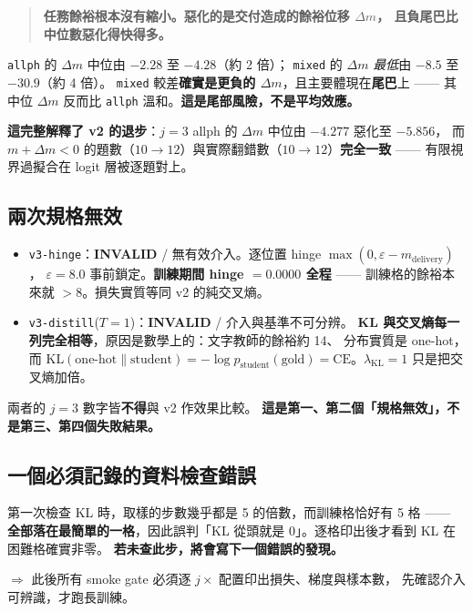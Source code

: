 \documentclass[11pt, a4paper]{article}
\newcommand{\INVALID}{\textcolor{orange!80!black}{\textbf{INVALID}}}
\begin{document}
\begin{quote}
\textbf{任務餘裕根本沒有縮小。惡化的是交付造成的餘裕位移 $\Delta m$，
且負尾巴比中位數惡化得快得多。}
\end{quote}

\verb|allph| 的 $\Delta m$ 中位由 $-2.28$ 至 $-4.28$（約 2 倍）；
\verb|mixed| 的 $\Delta m$ \emph{最低}由 $-8.5$ 至 $-30.9$（約 4 倍）。
\verb|mixed| 較差\textbf{確實是更負的 $\Delta m$}，且主要體現在\textbf{尾巴}上 ——
其中位 $\Delta m$ 反而比 \verb|allph| 溫和。\textbf{這是尾部風險，不是平均效應。}

\textbf{這完整解釋了 v2 的退步}：$j{=}3$ allph 的 $\Delta m$ 中位由 $-4.277$ 惡化至 $-5.856$，
而 $m{+}\Delta m{<}0$ 的題數（$10 \to 12$）與實際翻錯數（$10 \to 12$）\textbf{完全一致} ——
有限視界過擬合在 logit 層被逐題對上。

\subsection{兩次規格無效}

\begin{itemize}
  \item \texttt{v3-hinge}：\INVALID{} / 無有效介入。逐位置 hinge $\max(0, \varepsilon - m_{\text{delivery}})$，
        $\varepsilon = 8.0$ 事前鎖定。\textbf{訓練期間 hinge $= 0.0000$ 全程} ——
        訓練格的餘裕本來就 $> 8$。損失實質等同 v2 的純交叉熵。
  \item \texttt{v3-distill}($T{=}1$)：\INVALID{} / 介入與基準不可分辨。
        \textbf{KL 與交叉熵每一列完全相等}，原因是數學上的：文字教師的餘裕約 14、
        分布實質是 one-hot，而 $\mathrm{KL}(\text{one-hot} \| \text{student}) =
        -\log p_{\text{student}}(\text{gold}) = \mathrm{CE}$。$\lambda_{\mathrm{KL}}{=}1$ 只是把交叉熵加倍。
\end{itemize}

兩者的 $j{=}3$ 數字皆\textbf{不得}與 v2 作效果比較。
\textbf{這是第一、第二個「規格無效」，不是第三、第四個失敗結果。}

\subsection{一個必須記錄的資料檢查錯誤}

第一次檢查 KL 時，取樣的步數幾乎都是 5 的倍數，而訓練格恰好有 5 格 ——
\textbf{全部落在最簡單的一格}，因此誤判「KL 從頭就是 0」。逐格印出後才看到 KL 在困難格確實非零。
\textbf{若未查此步，將會寫下一個錯誤的發現。}

$\Rightarrow$ 此後所有 smoke gate 必須逐 $j \times$ 配置印出損失、梯度與樣本數，
先確認介入可辨識，才跑長訓練。
\end{document}
